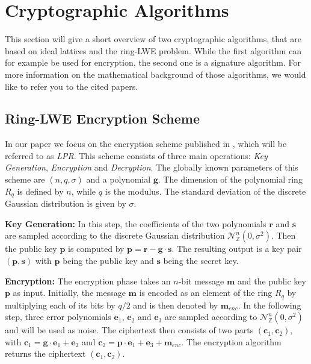 \section{Cryptographic Algorithms}
This section will give a short overview of two cryptographic algorithms, that are based on ideal lattices and the \ac{ring-LWE} problem. While the first algorithm can for example be used for encryption, the second one is a signature algorithm. For more information on the mathematical background of those algorithms, we would like to refer you to the cited papers.

\subsection{Ring-LWE Encryption Scheme}
In our paper we focus on the encryption scheme published in \cite{cryptoeprint:2012:230}, which will be referred to as \textit{\ac{LPR}}. This scheme consists of three main operations: \textit{Key Generation}, \textit{Encryption} and \textit{Decryption}. The globally known parameters of this scheme are \((n, q, \sigma)\) and a polynomial \(\textbf{g}\). The dimension of the polynomial ring \(R_q\) is defined by \(n\), while \(q\) is the modulus. The standard deviation of the discrete Gaussian distribution is given by \(\sigma\).

\textbf{Key Generation:} In this step, the coefficients of the two polynomials \(\textbf{r}\) and \(\textbf{s}\) are sampled according to the discrete Gaussian distribution \(\mathcal{N}_\mathbb{Z}^{n} (0, \sigma^2)\). Then the public key \(\textbf{p}\) is computed by \(\textbf{p} = \textbf{r} - \textbf{g} \cdot \textbf{s}\). The resulting output is a key pair \((\textbf{p}, \textbf{s})\) with \(\textbf{p}\) being the public key and \(\textbf{s}\) being the secret key.

\textbf{Encryption:} The encryption phase takes an \(n\)-bit message \(\textbf{m}\) and the public key \(\textbf{p}\) as input. Initially, the message \(\textbf{m}\) is encoded as an element of the ring \(R_q\) by multiplying each of its bits by \(q/2\) and is then denoted by \(\textbf{m}_{enc}\). In the following step, three error polynomials \(\textbf{e}_1\), \(\textbf{e}_2\) and \(\textbf{e}_3\) are sampled according to \(\mathcal{N}_\mathbb{Z}^{n} (0, \sigma^2)\) and will be used as noise. The ciphertext then consists of two parts \((\textbf{c}_1, \textbf{c}_2)\), with \(\textbf{c}_1 = \textbf{g} \cdot \textbf{e}_1 + \textbf{e}_2\) and \(\textbf{c}_2 = \textbf{p} \cdot \textbf{e}_1 + \textbf{e}_3 + \textbf{m}_{enc}\). The encryption algorithm returns the ciphertext \((\textbf{c}_1,\textbf{c}_2)\).

